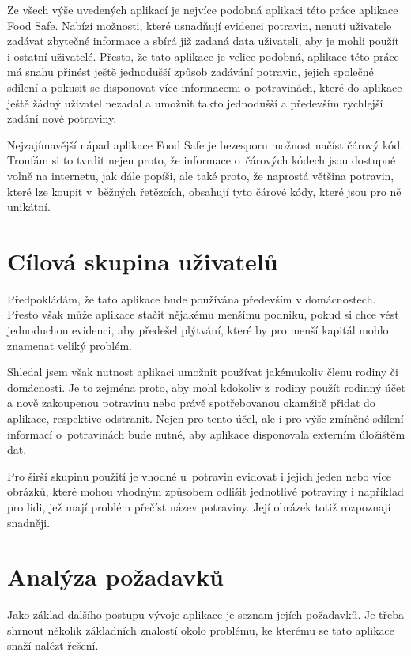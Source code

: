 \documentclass[thesis=B,czech]{FITthesis}[2013/10/20]
\begin{document}
Ze všech výše uvedených aplikací je nejvíce podobná aplikaci této práce aplikace Food Safe. Nabízí možnosti, které usnadňují evidenci potravin, nenutí uživatele zadávat zbytečné informace a sbírá již zadaná data uživateli, aby je mohli použít i ostatní uživatelé. Přesto, že tato aplikace je velice podobná, aplikace této práce má snahu přinést ještě jednodušší způsob zadávání potravin, jejich společné sdílení a pokusit se disponovat více informacemi o~potravinách, které do aplikace ještě žádný uživatel nezadal a umožnit takto jednodušší a především rychlejší zadání nové potraviny.

Nejzajímavější nápad aplikace Food Safe je bezesporu možnost načíst čárový kód. Troufám si to tvrdit nejen proto, že informace o~čárových kódech jsou dostupné volně na internetu, jak dále popíši, ale také proto, že naprostá většina potravin, které lze koupit v~běžných řetězcích, obsahují tyto čárové kódy, které jsou pro ně unikátní.

\section{Cílová skupina uživatelů}

Předpokládám, že tato aplikace bude používána především v domácnostech. Přesto však může aplikace stačit nějakému menšímu podniku, pokud si chce vést jednoduchou evidenci, 
aby předešel plýtvání, které by pro menší kapitál mohlo znamenat veliký problém.

Shledal jsem však nutnost aplikaci umožnit používat jakémukoliv členu rodiny či domácnosti. Je to zejména proto, aby mohl kdokoliv z~rodiny použít rodinný účet a nově zakoupenou potravinu nebo právě spotřebovanou okamžitě přidat do aplikace, respektive odstranit. Nejen pro tento účel, ale i pro výše zmíněné sdílení informací o~potravinách bude nutné, aby aplikace disponovala externím úložištěm dat.

Pro širší skupinu použití je vhodné u~potravin evidovat i jejich jeden nebo více obrázků, které mohou vhodným způsobem odlišit jednotlivé potraviny i například pro lidi, jež mají problém přečíst název potraviny. Její obrázek totiž rozpoznají snadněji.

\clearpage

\section{Analýza požadavků}

Jako základ dalšího postupu vývoje aplikace je seznam jejích požadavků. Je třeba shrnout několik základních znalostí okolo problému, ke kterému se tato aplikace snaží nalézt řešení.
\end{document}
